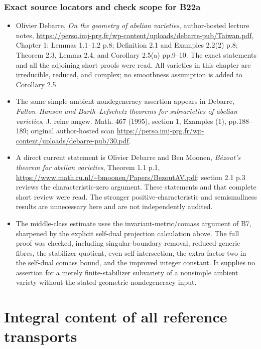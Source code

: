 \documentclass[11pt,a4paper]{article}
\providecommand{\tightlist}{\setlength{\itemsep}{0pt}\setlength{\parskip}{0pt}}
\theoremstyle{definition}
\begin{document}
\subsubsection{Exact source locators and check scope for B22a}\label{exact-source-locators-and-check-scope-for-b22a}

\begin{itemize}
\tightlist
\item
  Olivier Debarre, \emph{On the geometry of abelian varieties}, author-hosted lecture notes, \url{https://perso.imj-prg.fr/wp-content/uploads/debarre-pub/Taiwan.pdf}, Chapter 1: Lemmas 1.1--1.2 p.8; Definition 2.1 and Examples 2.2(2) p.8; Theorem 2.3, Lemma 2.4, and Corollary 2.5(a) pp.9--10. The exact statements and all the adjoining short proofs were read. All varieties in this chapter are irreducible, reduced, and complex; no smoothness assumption is added to Corollary 2.5.
\item
  The same simple-ambient nondegeneracy assertion appears in Debarre, \emph{Fulton--Hansen and Barth--Lefschetz theorems for subvarieties of abelian varieties}, J. reine angew. Math. 467 (1995), section 1, Examples (1), pp.188--189; original author-hosted scan \url{https://perso.imj-prg.fr/wp-content/uploads/debarre-pub/30.pdf}.
\item
  A direct current statement is Olivier Debarre and Ben Moonen, \emph{Bézout's theorem for abelian varieties}, Theorem 1.1 p.1, \url{https://www.math.ru.nl/~bmoonen/Papers/BezoutAV.pdf}; section 2.1 p.3 reviews the characteristic-zero argument. These statements and that complete short review were read. The stronger positive-characteristic and semismallness results are unnecessary here and are not independently audited.
\item
  The middle-class estimate uses the invariant-metric/comass argument of B7, sharpened by the explicit self-dual projection calculation above. The full proof was checked, including singular-boundary removal, reduced generic fibres, the stabilizer quotient, even self-intersection, the extra factor two in the self-dual comass bound, and the improved integer constant. It supplies no assertion for a merely finite-stabilizer subvariety of a nonsimple ambient variety without the stated geometric nondegeneracy input.
\end{itemize}

\section{Integral content of all reference transports}
\end{document}
